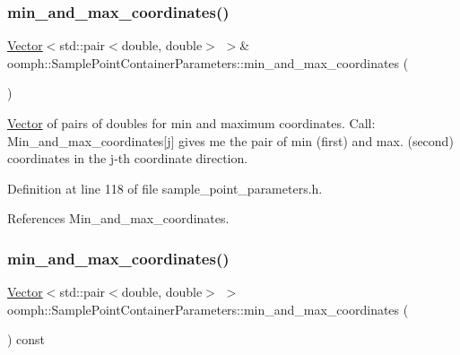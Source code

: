 \subsubsection{\texorpdfstring{min\+\_\+and\+\_\+max\+\_\+coordinates()}{min\_and\_max\_coordinates()}\hspace{0.1cm}{\footnotesize\ttfamily [1/2]}}
{\footnotesize\ttfamily \hyperlink{classoomph_1_1Vector}{Vector}$<$std\+::pair$<$double, double$>$ $>$\& oomph\+::\+Sample\+Point\+Container\+Parameters\+::min\+\_\+and\+\_\+max\+\_\+coordinates (\begin{DoxyParamCaption}{ }\end{DoxyParamCaption})\hspace{0.3cm}{\ttfamily [inline]}}



\hyperlink{classoomph_1_1Vector}{Vector} of pairs of doubles for min and maximum coordinates. Call\+: Min\+\_\+and\+\_\+max\+\_\+coordinates\mbox{[}j\mbox{]} gives me the pair of min (first) and max. (second) coordinates in the j-\/th coordinate direction. 



Definition at line 118 of file sample\+\_\+point\+\_\+parameters.\+h.



References Min\+\_\+and\+\_\+max\+\_\+coordinates.

\mbox{\label{classoomph_1_1SamplePointContainerParameters_ad619df6bc0253178dbbaf195cea2fb5a}} 
\subsubsection{\texorpdfstring{min\+\_\+and\+\_\+max\+\_\+coordinates()}{min\_and\_max\_coordinates()}\hspace{0.1cm}{\footnotesize\ttfamily [2/2]}}
{\footnotesize\ttfamily \hyperlink{classoomph_1_1Vector}{Vector}$<$std\+::pair$<$double, double$>$ $>$ oomph\+::\+Sample\+Point\+Container\+Parameters\+::min\+\_\+and\+\_\+max\+\_\+coordinates (\begin{DoxyParamCaption}{ }\end{DoxyParamCaption}) const\hspace{0.3cm}{\ttfamily [inline]}}



